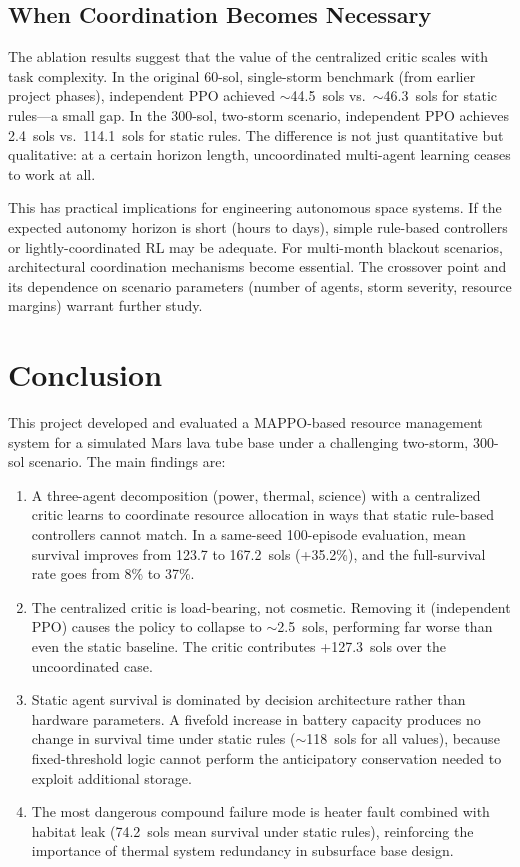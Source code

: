 \documentclass[11pt,a4paper]{article}
\begin{document}
\subsection{When Coordination Becomes Necessary}

The ablation results suggest that the value of the centralized critic scales with task complexity. In the original 60-sol, single-storm benchmark (from earlier project phases), independent PPO achieved $\sim$44.5~sols vs.\ $\sim$46.3~sols for static rules---a small gap. In the 300-sol, two-storm scenario, independent PPO achieves 2.4~sols vs.\ 114.1~sols for static rules. The difference is not just quantitative but qualitative: at a certain horizon length, uncoordinated multi-agent learning ceases to work at all.

This has practical implications for engineering autonomous space systems. If the expected autonomy horizon is short (hours to days), simple rule-based controllers or lightly-coordinated RL may be adequate. For multi-month blackout scenarios, architectural coordination mechanisms become essential. The crossover point and its dependence on scenario parameters (number of agents, storm severity, resource margins) warrant further study.

\section{Conclusion}

This project developed and evaluated a MAPPO-based resource management system for a simulated Mars lava tube base under a challenging two-storm, 300-sol scenario. The main findings are:

\begin{enumerate}[label=(\arabic*)]
  \item A three-agent decomposition (power, thermal, science) with a centralized critic learns to coordinate resource allocation in ways that static rule-based controllers cannot match. In a same-seed 100-episode evaluation, mean survival improves from 123.7 to 167.2~sols (+35.2\%), and the full-survival rate goes from 8\% to 37\%.
  \item The centralized critic is load-bearing, not cosmetic. Removing it (independent PPO) causes the policy to collapse to $\sim$2.5~sols, performing far worse than even the static baseline. The critic contributes +127.3~sols over the uncoordinated case.
  \item Static agent survival is dominated by decision architecture rather than hardware parameters. A fivefold increase in battery capacity produces no change in survival time under static rules ($\sim$118~sols for all values), because fixed-threshold logic cannot perform the anticipatory conservation needed to exploit additional storage.
  \item The most dangerous compound failure mode is heater fault combined with habitat leak (74.2~sols mean survival under static rules), reinforcing the importance of thermal system redundancy in subsurface base design.
\end{enumerate}
\end{document}

